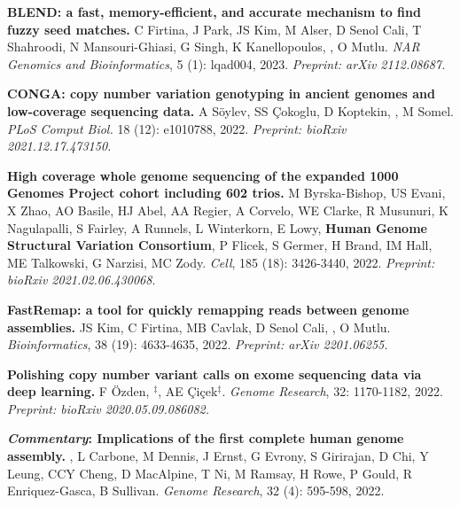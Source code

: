 \vspace{-.2cm}
{\bf BLEND: a fast, memory-efficient, and accurate mechanism to find fuzzy seed matches.}
C Firtina, J Park, JS Kim, M Alser, D Senol Cali, T Shahroodi, N Mansouri-Ghiasi, G Singh, K Kanellopoulos, \calkan{}, O Mutlu. {\it NAR Genomics and Bioinformatics}, 5 (1): lqad004, 2023.
\textit{Preprint: arXiv 2112.08687.}

\vspace{-.2cm}
{\bf CONGA: copy number variation genotyping in ancient genomes and low-coverage sequencing data.}  A Söylev, SS Çokoglu, D Koptekin, \calkan{}, M Somel.  
{\it PLoS Comput Biol.} 18 (12): e1010788, 2022.
\textit{Preprint: bioRxiv 2021.12.17.473150.}

\vspace{-.2cm}
{\bf High coverage whole genome sequencing of the expanded 1000 Genomes Project cohort including 602 trios.}  M Byrska-Bishop, US Evani, X Zhao, AO Basile, HJ Abel, AA Regier, A Corvelo, WE Clarke, R Musunuri, K Nagulapalli, S Fairley, A Runnels, L Winterkorn, E Lowy, \textbf{Human Genome Structural Variation Consortium}, P Flicek, S Germer, H Brand, IM Hall, ME Talkowski,  G Narzisi, MC Zody. {\it Cell}, 185 (18): 3426-3440, 2022.
\textit{Preprint: bioRxiv 2021.02.06.430068}.\\
\hspace*{1cm}
          {\footnotesize \em {}}



\vspace{-.2cm}
{\bf FastRemap: a tool for quickly remapping reads between genome assemblies.}
JS Kim, C Firtina, MB Cavlak, D Senol Cali, \calkan{}, O Mutlu.
{\it Bioinformatics}, 38 (19): 4633-4635, 2022. \textit {Preprint: arXiv 2201.06255.}

\vspace{-.2cm}
{\bf Polishing copy number variant calls on exome sequencing data via deep learning.}
F Özden, \calkan{}$^\ddag$, AE Çiçek$^\ddag$. {\it Genome Research}, 32: 1170-1182, 2022. \textit {Preprint: bioRxiv 2020.05.09.086082.}


\vspace{-.2cm}
{\bf \textit{Commentary}: Implications of the first complete human genome assembly.} \calkan{}, L Carbone, M Dennis, J Ernst, G Evrony, S Girirajan, D Chi, Y Leung, CCY Cheng, D MacAlpine, T Ni, M Ramsay, H Rowe, P Gould, R Enriquez-Gasca, B Sullivan. {\it Genome Research}, 32 (4): 595-598, 2022.


